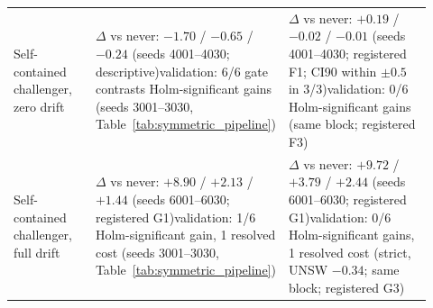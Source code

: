 \begin{table}[t]
\begin{tabular}{p{0.20\linewidth} p{0.36\linewidth} p{0.36\linewidth}}
Self-contained challenger, zero drift &
$\Delta$ vs never: $-1.70$ / $-0.65$ / $-0.24$ (seeds 4001--4030; descriptive)\newline validation: 6/6 gate contrasts Holm-significant gains (seeds 3001--3030, Table~\ref{tab:symmetric_pipeline}) &
$\Delta$ vs never: $+0.19$ / $-0.02$ / $-0.01$ (seeds 4001--4030; registered F1; CI90 within $\pm0.5$ in 3/3)\newline validation: 0/6 Holm-significant gains (same block; registered F3) \\
\addlinespace
Self-contained challenger, full drift &
$\Delta$ vs never: $+8.90$ / $+2.13$ / $+1.44$ (seeds 6001--6030; registered G1)\newline validation: 1/6 Holm-significant gain, 1 resolved cost (seeds 3001--3030, Table~\ref{tab:symmetric_pipeline}) &
$\Delta$ vs never: $+9.72$ / $+3.79$ / $+2.44$ (seeds 6001--6030; registered G1)\newline validation: 0/6 Holm-significant gains, 1 resolved cost (strict, UNSW $-0.34$; same block; registered G3) \\
\bottomrule
\end{tabular}
\end{table}
